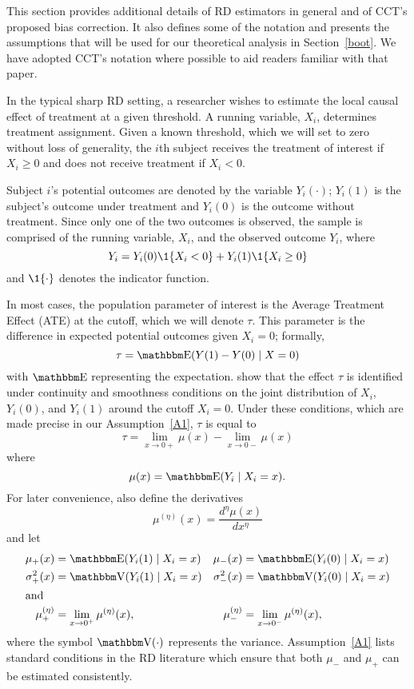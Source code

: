 \documentclass[12pt,fleqn]{article}
\begin{document}
This section provides additional details of RD estimators in general and of
CCT's proposed bias correction. It also defines some of the notation and
presents the assumptions that will be used for our theoretical analysis in
Section~\ref{boot}. We have adopted CCT's notation where possible to aid
readers familiar with that paper.

In the typical sharp RD setting, a researcher wishes to estimate the local
causal effect of treatment at a given threshold. A running variable, $X_{i}$,
determines treatment assignment.  Given a known threshold, which we
will set to zero without loss of generality, the $i$th subject receives the
treatment of interest if $X_{i} \geq 0$ and does not receive treatment if
$X_{i} < 0$.

Subject $i$'s potential outcomes are denoted by the variable $Y_i(\cdot)$;
$Y_i(1)$ is the subject's outcome under treatment and $Y_i(0)$
is the outcome without treatment. Since only one of the two
outcomes is observed, the sample is comprised of the running variable, $X_{i}$,
and the observed outcome $Y_i$, where
\begin{equation*}
  Y_{i}=Y_{i}(0) \1\{X_{i}<0\}+Y_{i}(1) \1\{X_{i} \geq 0\}
\end{equation*}
and $\1\{ \cdot\}$ denotes the indicator function.

In most cases, the population parameter of interest is the Average Treatment
Effect (ATE) at the cutoff, which we will denote $\tau$. This parameter is the
difference in expected potential outcomes given $X_i = 0$; formally,
\begin{equation*}
  \tau=\E(Y(1)-Y(0) \mid X=0)
\end{equation*}
with $\E$ representing the expectation.
\cite{HTV2001} show that the effect $\tau$ is identified under continuity and
smoothness conditions on the joint distribution of $X_i$, $Y_i(0)$, and $Y_i(1)$
around the cutoff $X_i = 0$. Under these conditions, which are made precise
in our Assumption~\ref{A1}, $\tau$ is equal to
\begin{equation*}
  \tau = \lim_{x \to 0+} \mu(x) - \lim_{x \to 0-} \mu(x)
\end{equation*}
where
\begin{equation*}
  \mu(x)= \E(Y_{i} \mid X_{i}=x).
\end{equation*}
For later convenience, also define the derivatives
\begin{equation*}
  \mu^{(\eta)}(x)=\frac{d^{\eta}\mu(x)}{dx^{\eta}}
\end{equation*}
and let
\begin{align*}
  \mu_{+}(x)
  &= \E( Y_{i}(1) \mid X_{i}=x )
  &\mu_{-}(x)
  &= \E( Y_{i}(0) \mid X_{i}=x ) \\
  \sigma^{2}_{+}(x) &= \V( Y_{i}(1) \mid X_{i}=x )
  &\sigma^{2}_{-}(x)&=\V( Y_{i}(0) \mid X_{i}=x ) \\
\intertext{and}
  \mu^{(\eta)}_{+}
  &= \lim_{x \rightarrow 0^{+}}\mu^{(\eta)}(x),
  &\mu^{(\eta)}_{-}
  &= \lim_{x \rightarrow 0^{-}}\mu^{(\eta)}(x),
\end{align*}
where the symbol $\V(\cdot)$ represents the variance. Assumption~\ref{A1} lists
standard conditions in the RD literature which ensure that both $\mu_-$ and
$\mu_+$ can be estimated consistently.
\end{document}
